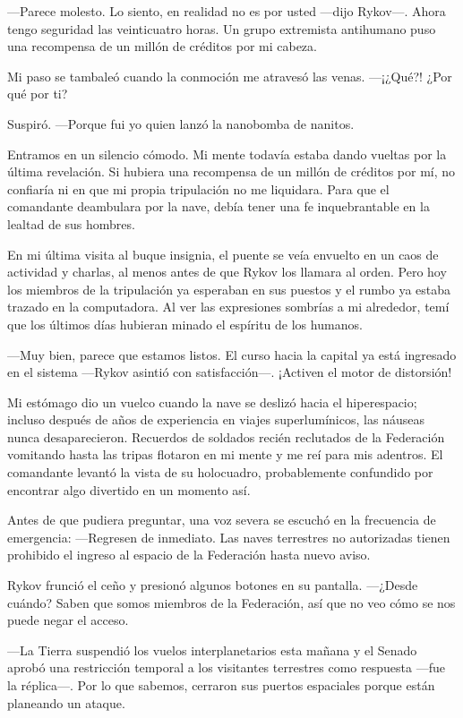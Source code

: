 —Parece molesto. Lo siento, en realidad no es por usted —dijo Rykov—. Ahora tengo seguridad las veinticuatro horas. Un grupo extremista antihumano puso una recompensa de un millón de créditos por mi cabeza.

Mi paso se tambaleó cuando la conmoción me atravesó las venas. —¡¿Qué?! ¿Por qué por ti?

Suspiró. —Porque fui yo quien lanzó la nanobomba de nanitos.

Entramos en un silencio cómodo. Mi mente todavía estaba dando vueltas por la última revelación. Si hubiera una recompensa de un millón de créditos por mí, no confiaría ni en que mi propia tripulación no me liquidara. Para que el comandante deambulara por la nave, debía tener una fe inquebrantable en la lealtad de sus hombres.

En mi última visita al buque insignia, el puente se veía envuelto en un caos de actividad y charlas, al menos antes de que Rykov los llamara al orden. Pero hoy los miembros de la tripulación ya esperaban en sus puestos y el rumbo ya estaba trazado en la computadora. Al ver las expresiones sombrías a mi alrededor, temí que los últimos días hubieran minado el espíritu de los humanos.

—Muy bien, parece que estamos listos. El curso hacia la capital ya está ingresado en el sistema —Rykov asintió con satisfacción—. ¡Activen el motor de distorsión!

Mi estómago dio un vuelco cuando la nave se deslizó hacia el hiperespacio; incluso después de años de experiencia en viajes superlumínicos, las náuseas nunca desaparecieron. Recuerdos de soldados recién reclutados de la Federación vomitando hasta las tripas flotaron en mi mente y me reí para mis adentros. El comandante levantó la vista de su holocuadro, probablemente confundido por encontrar algo divertido en un momento así.

Antes de que pudiera preguntar, una voz severa se escuchó en la frecuencia de emergencia: —Regresen de inmediato. Las naves terrestres no autorizadas tienen prohibido el ingreso al espacio de la Federación hasta nuevo aviso.

Rykov frunció el ceño y presionó algunos botones en su pantalla. —¿Desde cuándo? Saben que somos miembros de la Federación, así que no veo cómo se nos puede negar el acceso.

—La Tierra suspendió los vuelos interplanetarios esta mañana y el Senado aprobó una restricción temporal a los visitantes terrestres como respuesta —fue la réplica—. Por lo que sabemos, cerraron sus puertos espaciales porque están planeando un ataque.

